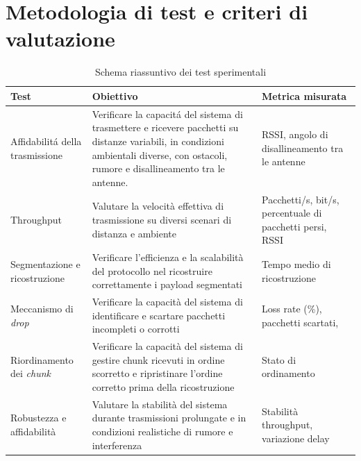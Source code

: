 \documentclass[12pt,a4paper,twoside]{book}
\begin{document}
\section{Metodologia di test e criteri di valutazione}
\begin{table}[H]
    \centering
    \renewcommand{\arraystretch}{1.2}
    \begin{tabular}{|p{4cm}|p{6.5cm}|p{4cm}|}
        \hline
        \textbf{Test}                     & \textbf{Obiettivo}                                                                                                                                                                       & \textbf{Metrica misurata}                                     \\
        \hline
        Affidabilit\'a della trasmissione & Verificare la capacit\'a del sistema di trasmettere e ricevere pacchetti su distanze variabili, in condizioni ambientali diverse, con ostacoli, rumore e disallineamento tra le antenne. & \ac{RSSI}, angolo di disallineamento tra le antenne           \\
        \hline
        Throughput                        & Valutare la velocità effettiva di trasmissione su diversi scenari di distanza e ambiente                                                                                                 & Pacchetti/s, bit/s, percentuale di pacchetti persi, \ac{RSSI} \\
        \hline
        Segmentazione e ricostruzione     & Verificare l'efficienza e la scalabilità del protocollo nel ricostruire correttamente i payload segmentati                                                                               & Tempo medio di ricostruzione                                  \\
        \hline
        Meccanismo di \emph{drop}         & Verificare la capacità del sistema di identificare e scartare pacchetti incompleti o corrotti                                                                                            & Loss rate (\%), pacchetti scartati,                           \\
        \hline
        Riordinamento dei \emph{chunk}    & Verificare la capacità del sistema di gestire chunk ricevuti in ordine scorretto e ripristinare l'ordine corretto prima della ricostruzione                                              & Stato di ordinamento                                          \\
        \hline
        Robustezza e affidabilità         & Valutare la stabilità del sistema durante trasmissioni prolungate e in condizioni realistiche di rumore e interferenza                                                                   & Stabilità throughput, variazione delay                        \\
        \hline
    \end{tabular}
    \caption{Schema riassuntivo dei test sperimentali}
    \label{tab:riassunto_test}
\end{table}
\end{document}
